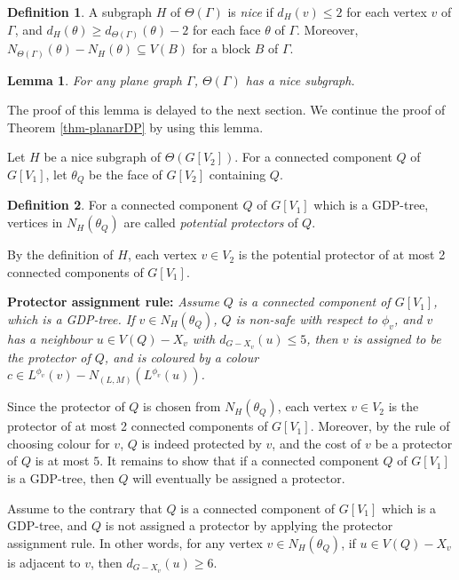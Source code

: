 \documentclass[11pt,a4paper]{article}
\newtheorem{lem}{Lemma}
\theoremstyle{definition}
\newtheorem{definition}{Definition}
\begin{document}
    \begin{definition}
    \label{def-nice}
    A subgraph $H$ of $\Theta(\Gamma)$ is {\em nice} if $d_{H}(v) \le 2$ for each vertex $v$ of $\Gamma$, and $d_{H}(\theta) \ge  d_{\Theta(\Gamma)}(\theta)-2$ for each face $\theta $ of $\Gamma$. Moreover, $N_{\Theta(\Gamma)}(\theta) - N_H(\theta) \subseteq V(B)$ for a block $B$ of $\Gamma$.
\end{definition}

\begin{lem}
    \label{lem-nice}
    For any plane graph $\Gamma$, $\Theta(\Gamma)$ has a nice subgraph.
\end{lem}
 
The proof of this lemma is delayed to the next section. We continue the proof of Theorem \ref{thm-planarDP} by using this lemma. 

Let $H$ be a nice subgraph of $\Theta(G[V_2])$.
For a connected component $Q$ of $G[V_1]$, let $\theta_Q$ be the face of $G[V_2]$ containing $Q$. 

\begin{definition}
    \label{def-potential}
    For a connected component $Q$ of $G[V_1]$ which is a GDP-tree, vertices in $N_H(\theta_Q)$ are called {\em potential protectors} of $Q$.
\end{definition}

 
By the definition of $H$, each vertex $v \in V_2$ is the potential protector of at most 2 connected components of $G[V_1]$. 

\medskip
\noindent
{\bf Protector assignment rule:}
    {\em Assume $Q$ is a connected component of $G[V_1]$, which is a GDP-tree. If $v \in N_H(\theta_Q)$, $Q$ is non-safe with respect to $\phi_v$, and $v$ has a neighbour $u \in V(Q)-X_v$ with $d_{G-X_v}(u) \le 5$, then $v$ is assigned to be the protector of $Q$, and is coloured by a colour $c \in L^{\phi_v}(v) - N_{(L,M)}(L^{\phi_v}(u))$.}

 
\medskip

Since the protector of $Q$ 
 is chosen from $N_H(\theta_Q)$,   each vertex $v \in V_2$ is the protector of at most 2 connected components of $G[V_1]$. 
 Moreover, by the rule of choosing colour for $v$, $Q$ is indeed protected by $v$, and the cost of $v$ be a protector of $Q$ is at most $5$.   It remains to show that if a connected component $Q$ of $G[V_1]$ is a GDP-tree, then $Q$ will eventually be assigned a protector.

Assume to the contrary that $Q$ is a connected component of $G[V_1]$ which is a GDP-tree, and $Q$ is not assigned a protector by applying the protector assignment rule. In other words, for any vertex $v \in N_H(\theta_Q)$, if $u \in V(Q)-X_v$ is adjacent to $v$, then $d_{G-X_v}(u) \ge 6$.
\end{document}

